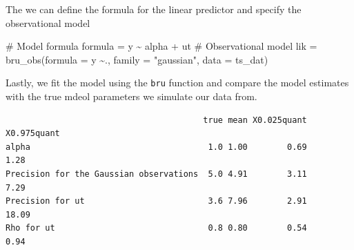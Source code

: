 \documentclass[
  letterpaper,
  DIV=11,
  numbers=noendperiod]{scrartcl}
\newenvironment{Shaded}{\begin{snugshade}}{\end{snugshade}}
\newcommand{\AttributeTok}[1]{\textcolor[rgb]{0.40,0.45,0.13}{#1}}
\newcommand{\CommentTok}[1]{\textcolor[rgb]{0.37,0.37,0.37}{#1}}
\newcommand{\DecValTok}[1]{\textcolor[rgb]{0.68,0.00,0.00}{#1}}
\newcommand{\FunctionTok}[1]{\textcolor[rgb]{0.28,0.35,0.67}{#1}}
\newcommand{\NormalTok}[1]{\textcolor[rgb]{0.00,0.23,0.31}{#1}}
\newcommand{\OtherTok}[1]{\textcolor[rgb]{0.00,0.23,0.31}{#1}}
\newcommand{\SpecialCharTok}[1]{\textcolor[rgb]{0.37,0.37,0.37}{#1}}
\newcommand{\StringTok}[1]{\textcolor[rgb]{0.13,0.47,0.30}{#1}}
\begin{document}
The we can define the formula for the linear predictor and specify the
observational model

\begin{Shaded}
\begin{Highlighting}[]
\CommentTok{\# Model formula}
\NormalTok{formula }\OtherTok{=}\NormalTok{ y }\SpecialCharTok{\textasciitilde{}}\NormalTok{ alpha }\SpecialCharTok{+}\NormalTok{ ut}
\CommentTok{\# Observational model}
\NormalTok{lik }\OtherTok{=}  \FunctionTok{bru\_obs}\NormalTok{(}\AttributeTok{formula =}\NormalTok{ y }\SpecialCharTok{\textasciitilde{}}\NormalTok{.,}
            \AttributeTok{family =} \StringTok{"gaussian"}\NormalTok{,}
            \AttributeTok{data =}\NormalTok{ ts\_dat)}
\end{Highlighting}
\end{Shaded}

Lastly, we fit the model using the \texttt{bru} function and compare the
model estimates with the true mdeol parameters we simulate our data
from.

\begin{Shaded}
\end{Shaded}

\begin{verbatim}
                                        true mean X0.025quant X0.975quant
alpha                                    1.0 1.00        0.69        1.28
Precision for the Gaussian observations  5.0 4.91        3.11        7.29
Precision for ut                         3.6 7.96        2.91       18.09
Rho for ut                               0.8 0.80        0.54        0.94
\end{verbatim}
\end{document}
